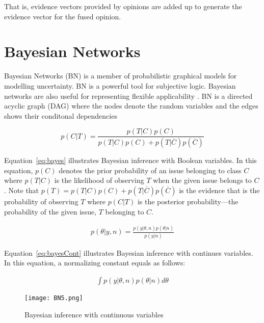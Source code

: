 \documentclass[a4,12pt]{ozu-thesis}
\begin{document}
That is, evidence vectors provided by opinions are added up to generate the evidence vector for the fused opinion.

\section{Bayesian Networks}
Bayesian Networks (BN) is a member of probabilistic graphical models for modelling uncertainty. BN is a powerful tool for subjective logic. Bayesian networks are also useful for representing flexible applicability \cite{de2003probabilistic}.
BN is a directed acyclic graph (DAG) where the nodes denote the random variables and the edges shows their conditonal dependencies

\begin{equation}
\label{eq:bayes}
p\left (C|T \right ) = \frac{p\left ( T|C \right )p\left ( C \right )}{p\left ( T|C \right )p\left ( C \right ) + p\left ( T|\overline{C} \right )p\left ( \overline{C} \right )}
\end{equation}


Equation~\ref{eq:bayes} illustrates Bayesian inference with Boolean variables. In this equation, $p(C)$ denotes the prior probability of an issue belonging to class $C$ where $p(T|C)$ is the likelihood of observing $T$ when the given issue belongs to $C$. Note that $p(T)= p\left ( T|C \right )p\left ( C \right ) + p\left ( T|\overline{C} \right )p\left ( \overline{C} \right )$ is the evidence that is the probability of observing $T$ where $p(C|T)$ is the posterior probability---the probability of the given issue, $T$ belonging to $C$.

\begin{align}
\label{eq:bayesCont}
p\left ( \theta | y, n \right ) = \frac{p\left ( y| \theta , n \right )p\left ( \theta |n \right )}{p\left ( y|n \right )}
\end{align}

Equation~\ref{eq:bayesCont} illustrates Bayesian inference with continues variables. In this equation, a normalizing constant equals as follows: 

\begin{align}
\label{eq:normal}
\int p\left ( y|\theta ,n \right )p\left ( \theta |n \right )d\theta 
\end{align}
\begin{figure}[h]
\begin{center}
\texttt{[image: BN5.png]}
\end{center}
\caption{Bayesian inference with continuous variables \cite{cmu1}}
\end{figure}
\end{document}
